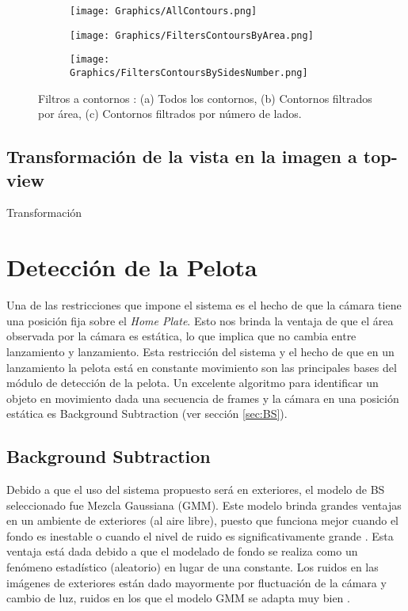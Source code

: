 \begin{figure}[h!]
	\centering
	\begin{subfigure}[b]{0.32\linewidth}
		\centering
		\texttt{[image: Graphics/AllContours.png]}
		\caption{}
	\end{subfigure}
	\begin{subfigure}[b]{0.32\linewidth}
		\centering
		\texttt{[image: Graphics/FiltersContoursByArea.png]}
		\caption{}
	\end{subfigure}
	\begin{subfigure}[b]{0.32\linewidth}
		\centering
		\texttt{[image: Graphics/FiltersContoursBySidesNumber.png]}
		\caption{}
	\end{subfigure}
	\caption{Filtros a contornos : (a) Todos los contornos, (b) Contornos filtrados por área, (c) Contornos filtrados por número de lados.}
	\label{fig:FilteredContours}
\end{figure}

\subsection{Transformación de la vista en la imagen a top-view}

Transformación

\section{Detección de la Pelota}

Una de las restricciones que impone el sistema es el hecho de que la cámara tiene una posición fija sobre el \textit{Home Plate}. Esto nos brinda la ventaja de que el área observada por la cámara es estática, lo que implica que no cambia entre lanzamiento y lanzamiento. Esta restricción del sistema y el hecho de que en un lanzamiento la pelota está en constante movimiento son las principales bases del módulo de detección de la pelota. Un excelente algoritmo para identificar un objeto en movimiento dada una secuencia de frames y la cámara en una posición estática es Background Subtraction (ver sección \ref{sec:BS}).

\subsection{Background Subtraction}

Debido a que el uso del sistema propuesto será en exteriores, el modelo de BS seleccionado fue Mezcla Gaussiana (GMM). Este modelo brinda grandes ventajas en un ambiente de exteriores (al aire libre), puesto que funciona mejor cuando el fondo es inestable o cuando el nivel de ruido es significativamente grande \cite{YannickPierreMarcBrunoHeleneChristophe}. Esta ventaja está dada debido a que el modelado de fondo se realiza como un fenómeno estadístico (aleatorio) en lugar de una constante. Los ruidos en las imágenes de exteriores están dado mayormente por fluctuación de la cámara y cambio de luz, ruidos en los que el modelo GMM se adapta muy bien \cite{GMM}.

